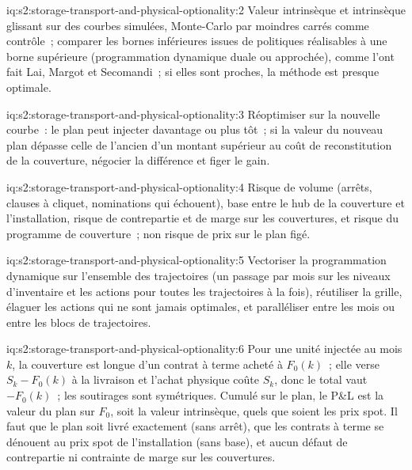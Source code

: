 \begin{solution}{iq:s2:storage-transport-and-physical-optionality:2}
Valeur intrinsèque et intrinsèque glissant sur des courbes simulées, Monte-Carlo par moindres carrés comme contrôle~; comparer les bornes inférieures issues de politiques réalisables à une
borne supérieure (programmation dynamique duale ou approchée), comme l'ont fait Lai, Margot et Secomandi~; si elles sont proches, la méthode est presque optimale.
\end{solution}

\begin{solution}{iq:s2:storage-transport-and-physical-optionality:3}
Réoptimiser sur la nouvelle courbe~: le plan peut injecter davantage ou plus tôt~; si la valeur du nouveau plan dépasse celle de l'ancien d'un montant supérieur au coût de reconstitution de la couverture,
négocier la différence et figer le gain.
\end{solution}

\begin{solution}{iq:s2:storage-transport-and-physical-optionality:4}
Risque de volume (arrêts, clauses à cliquet, nominations qui échouent), base entre le hub de la couverture et l'installation, risque de contrepartie et de marge sur les couvertures,
et risque du programme de couverture~; non risque de prix sur le plan figé.
\end{solution}

\begin{solution}{iq:s2:storage-transport-and-physical-optionality:5}
Vectoriser la programmation dynamique sur l'ensemble des trajectoires (un passage par mois sur les niveaux d'inventaire et les actions pour toutes les trajectoires à la fois), réutiliser la grille, élaguer
les actions qui ne sont jamais optimales, et paralléliser entre les mois ou entre les blocs de trajectoires.
\end{solution}

\begin{solution}{iq:s2:storage-transport-and-physical-optionality:6}
Pour une unité injectée au mois $k$, la couverture est longue d'un contrat à terme acheté à $F_0(k)$~; elle verse $S_k - F_0(k)$ à la livraison et l'achat physique coûte
$S_k$, donc le total vaut $-F_0(k)$~; les soutirages sont symétriques. Cumulé sur le plan, le P\&L est la valeur du plan sur $F_0$, soit la valeur intrinsèque,
quels que soient les prix spot. Il faut que le plan soit livré exactement (sans arrêt), que les contrats à terme se dénouent au prix spot de l'installation (sans base),
et aucun défaut de contrepartie ni contrainte de marge sur les couvertures.
\end{solution}
